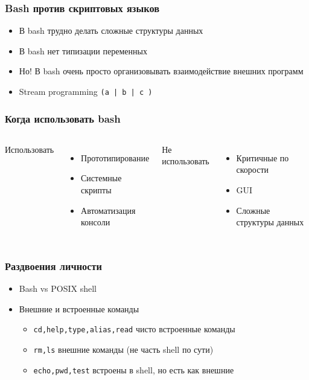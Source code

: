 \begin{frame}
  \frametitle{Bash против скриптовых языков}
  \begin{itemize}
   \item В bash трудно делать сложные структуры данных
   \item В bash нет типизации переменных
   \item Но! В bash очень просто организовывать взаимодействие внешних программ
   \item Stream programming \texttt{(a | b | c )}
  \end{itemize}
\end{frame}

\begin{frame}
  \frametitle{Когда использовать bash}
  \begin{columns}
    \begin{center}
     {\Large Использовать}
    \end{center}
    \begin{itemize}
      \item Прототипирование
      \item Системные скрипты
      \item Автоматизация консоли
    \end{itemize}
    \begin{center}
     {\Large Не использовать}
    \end{center}
    \begin{itemize}
      \item Критичные по скорости
      \item GUI
      \item Сложные структуры данных
    \end{itemize}
  \end{columns}
\end{frame}

\begin{frame}
  \frametitle{Раздвоения личности}
  \begin{itemize}
    \item  Bash vs POSIX shell
    \item  Внешние и встроенные команды
    \begin{itemize}
      \item \texttt{cd,help,type,alias,read} чисто встроенные команды
      \item \texttt{rm,ls} внешние команды (не часть shell по сути)
      \item \texttt{echo,pwd,test} встроены в shell, но есть как внешние
    \end{itemize}
  \end{itemize}
\end{frame}
